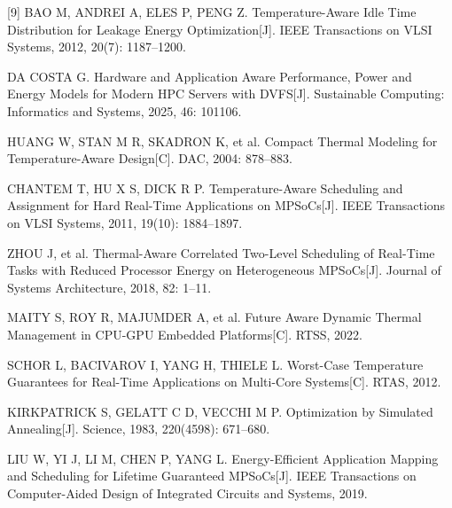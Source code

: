 [9] BAO M, ANDREI A, ELES P, PENG Z. Temperature-Aware Idle Time Distribution for Leakage Energy Optimization[J]. IEEE Transactions on VLSI Systems, 2012, 20(7): 1187--1200.\par
[10] DA COSTA G. Hardware and Application Aware Performance, Power and Energy Models for Modern HPC Servers with DVFS[J]. Sustainable Computing: Informatics and Systems, 2025, 46: 101106.\par
[11] HUANG W, STAN M R, SKADRON K, et al. Compact Thermal Modeling for Temperature-Aware Design[C]. DAC, 2004: 878--883.\par
[12] CHANTEM T, HU X S, DICK R P. Temperature-Aware Scheduling and Assignment for Hard Real-Time Applications on MPSoCs[J]. IEEE Transactions on VLSI Systems, 2011, 19(10): 1884--1897.\par
[13] ZHOU J, et al. Thermal-Aware Correlated Two-Level Scheduling of Real-Time Tasks with Reduced Processor Energy on Heterogeneous MPSoCs[J]. Journal of Systems Architecture, 2018, 82: 1--11.\par
[14] MAITY S, ROY R, MAJUMDER A, et al. Future Aware Dynamic Thermal Management in CPU-GPU Embedded Platforms[C]. RTSS, 2022.\par
[15] SCHOR L, BACIVAROV I, YANG H, THIELE L. Worst-Case Temperature Guarantees for Real-Time Applications on Multi-Core Systems[C]. RTAS, 2012.\par
[16] KIRKPATRICK S, GELATT C D, VECCHI M P. Optimization by Simulated Annealing[J]. Science, 1983, 220(4598): 671--680.\par
[17] LIU W, YI J, LI M, CHEN P, YANG L. Energy-Efficient Application Mapping and Scheduling for Lifetime Guaranteed MPSoCs[J]. IEEE Transactions on Computer-Aided Design of Integrated Circuits and Systems, 2019.\par
\endgroup
